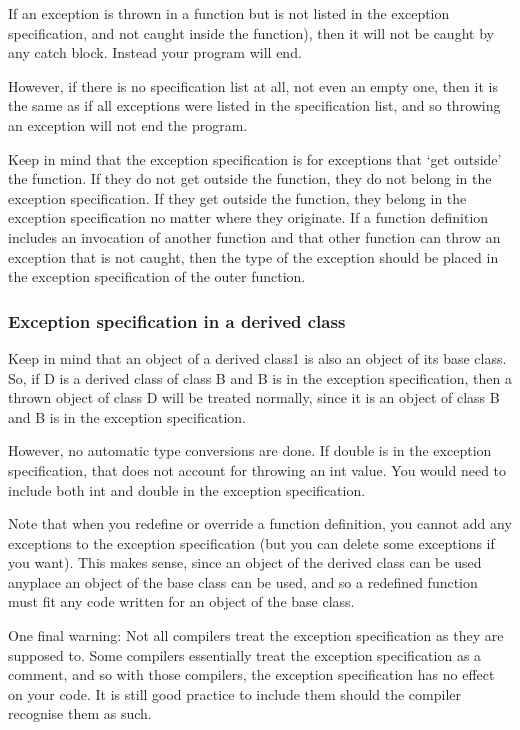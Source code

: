 If an exception is thrown in a function but is not listed in the exception specification, and not caught
inside the function), then it will not be caught by any catch block. Instead your program will end.

However, if there is no specification list at all, not even an empty one, then it is the same as if all
exceptions were listed in the specification list, and so throwing an exception will not end the program.

Keep in mind that the exception specification is for exceptions that `get outside' the function. If they
do not get outside the function, they do not belong in the exception specification. If they get outside
the function, they belong in the exception specification no matter where they originate. If a function
definition includes an invocation of another function and that other function can throw an exception that
is not caught, then the type of the exception should be placed in the exception specification of the outer
function.


\subsubsection*{Exception specification in a derived class}
Keep in mind that an object of a derived class1 is also an object of its base class. So, if D is a derived
class of class B and B is in the exception specification, then a thrown object of class D will be treated
normally, since it is an object of class B and B is in the exception specification.

However, no automatic type conversions are done. If double is in the exception specification, that does
not account for throwing an int value. You would need to include both int and double in the exception
specification.

Note that when you redefine or override a function definition, you cannot add any exceptions to the
exception specification (but you can delete some exceptions if you want). This makes sense, since an
object of the derived class can be used anyplace an object of the base class can be used, and so a
redefined function must fit any code written for an object of the base class.

One final warning: Not all compilers treat the exception specification as they are supposed to. Some
compilers essentially treat the exception specification as a comment, and so with those compilers, the
exception specification has no effect on your code. It is still good practice to include them should the
compiler recognise them as such.





